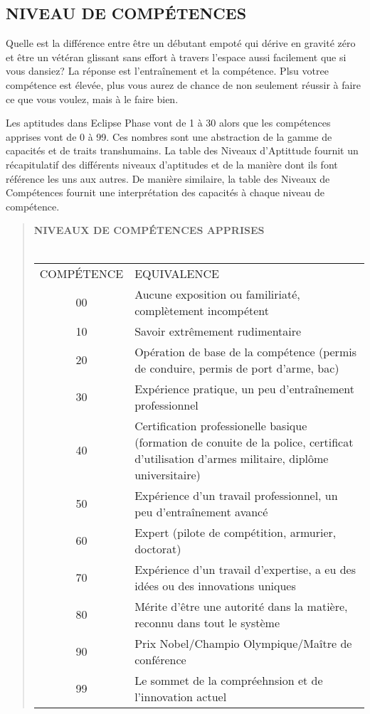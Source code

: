 \subsection{NIVEAU DE COMPÉTENCES} Quelle est la différence entre être un débutant empoté qui dérive en gravité zéro et être un vétéran glissant sans effort à travers l'espace aussi facilement que si vous dansiez? La réponse est l'entraînement et la compétence. Plsu votree compétence est élevée, plus vous aurez de chance de non seulement réussir à faire ce que vous voulez, mais à le faire bien. 

Les aptitudes dans Eclipse Phase vont de 1 à 30 alors que les compétences apprises vont de 0 à 99. Ces nombres sont une abstraction de la gamme de capacités et de traits transhumains. La table des Niveaux d'Aptittude fournit un récapitulatif des différents niveaux d'aptitudes et de la manière dont ils font référence les uns aux autres. De manière similaire, la table des Niveaux de Compétences fournit une interprétation des capacités à chaque niveau de compétence. 



\begin{quotation} \textbf{NIVEAUX DE COMPÉTENCES APPRISES} \\ \\ \begin{tabular}{cl} COMPÉTENCE &EQUIVALENCE \\ 00 &Aucune exposition ou familiriaté, complètement incompétent\\ 10 &Savoir extrêmement rudimentaire\\ 20 &Opération de base de la compétence (permis de conduire, permis de port d'arme, bac) \\ 30 &Expérience pratique, un peu d'entraînement professionnel \\ 40 &Certification professionelle basique (formation de conuite de la police, certificat d'utilisation d'armes militaire, diplôme universitaire) \\ 50 &Expérience d'un travail professionnel, un peu d'entraînement avancé \\ 60 &Expert (pilote de compétition, armurier, doctorat) \\ 70 &Expérience d'un travail d'expertise, a eu des idées ou des innovations uniques \\ 80 &Mérite d'être une autorité dans la matière, reconnu dans tout le système\\ 90 &Prix Nobel/Champio Olympique/Maître de conférence\\ 99 &Le sommet de la compréehnsion et de l'innovation actuel\\ \end{tabular} \end{quotation} 





